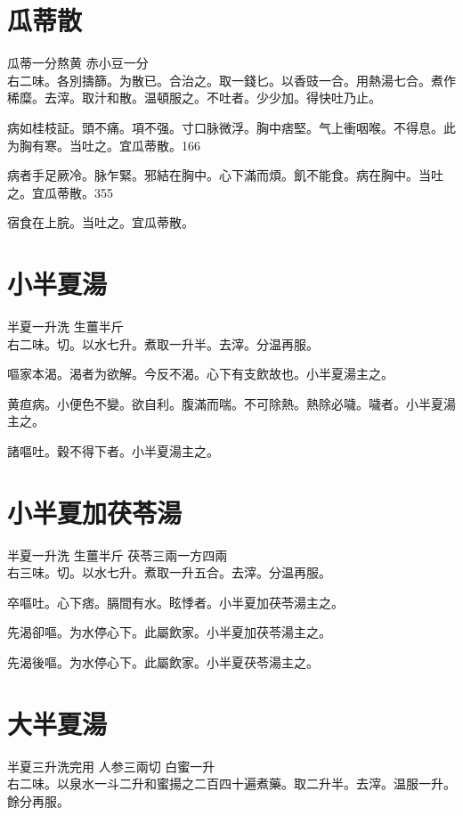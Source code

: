 \section{瓜蒂散}

瓜蒂{\scriptsize 一分熬黄} 赤小豆{\scriptsize 一分}\\
右二味。各別擣篩。为散已。合治之。取一錢匕。以香豉一合。用熱湯七合。煮作稀糜。去滓。取汁和散。温頓服之。不吐者。少少加。得快吐乃止。

病如桂枝証。頭不痛。項不强。寸{\khaaitp 口}脉微浮。胸中痞堅。气上衝咽喉。不得息。此为胸有寒。当吐之。宜瓜蒂散。166

病者手足厥冷。脉乍緊。邪結在胸中。心下滿而煩。飢不能食。病在胸中。当吐之。宜瓜蒂散。355

宿食在上脘。当吐之。宜瓜蒂散。

\section{小半夏湯}

半夏{\scriptsize 一升洗} 生薑{\scriptsize 半斤}\\
右二味。切。以水七升。煮取一升半。去滓。分温再服。

嘔家本渴。渴者为欲解。今反不渴。心下有支飲故也。小半夏湯主之。

黄疸病。小便色不變。欲自利。腹滿而喘。不可除熱。熱除必噦。噦者。小半夏湯主之。

諸嘔吐。穀不得下者。小半夏湯主之。

\section{小半夏加茯苓湯}

半夏{\scriptsize 一升洗} 生薑{\scriptsize 半斤} 茯苓{\scriptsize 三兩一方四兩}\\
右三味。切。以水七升。煮取一升五合。去滓。分温再服。

卒嘔吐。心下痞。膈間有水。眩悸者。{\khaaitp 小}半夏加茯苓湯主之。

先渴卻嘔。为水停心下。此屬飲家。小半夏加茯苓湯主之。{\wuben}

先渴後嘔。为水停心下。此屬飲家。小半夏茯苓湯主之。{\dengben}

\section{大半夏湯}

半夏{\scriptsize 三升洗完用} 人参{\scriptsize 三兩切} 白蜜{\scriptsize 一升}\\
右二味。以泉水一斗二升和蜜揚之二百四十遍煮藥。取二升半。去滓。温服一升。餘分再服。


